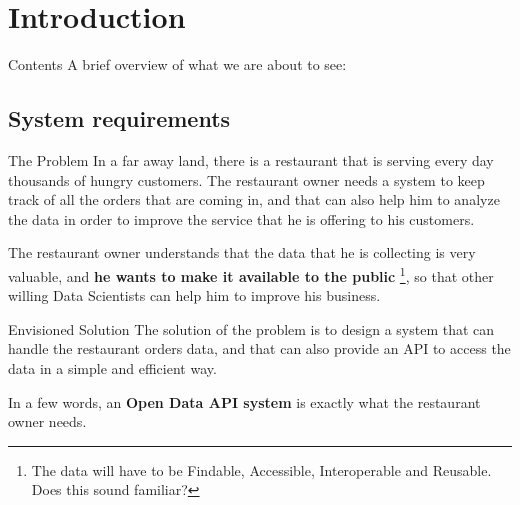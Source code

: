 

\section[Introduction]{Introduction}

\begin{frame}{Contents}
	A brief overview of what we are about to see:
	\tableofcontents
\end{frame}

\subsection{System requirements}

\begin{frame}{The Problem}
	In a far away land, there is a restaurant that is serving every day
	thousands of hungry customers. The restaurant owner needs a system to keep
	track of all the orders that are coming in, and that can also help him to
	analyze the data in order to improve the service that he is offering to his
	customers.

	The restaurant owner understands that the data that he is collecting is very
	valuable, and \textbf{he wants to make it available to the public}%
	\footnote{The data will have to be Findable, Accessible, Interoperable and %
	Reusable. Does this sound familiar?}, so that other willing Data Scientists
	can help him to improve his business.
\end{frame}

\begin{frame}{Envisioned Solution}
	The solution of the problem is to design a system that can handle the
	restaurant orders data, and that can also provide an API to access the data
	in a simple and efficient way.

	In a few words, an \textbf{Open Data API system} is exactly what the
	restaurant owner needs.
\end{frame}


